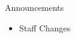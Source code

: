 \begin{frame}{Announcements}
    \begin{itemize}
        \item Staff Changes
    \end{itemize}
\end{frame}
